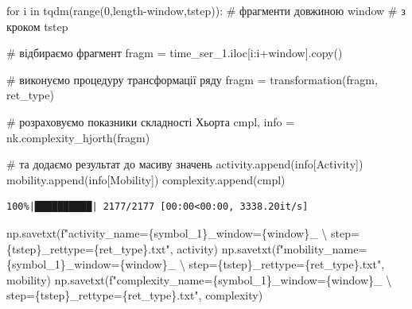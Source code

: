 \documentclass[
  letterpaper,
]{report}
\newenvironment{Shaded}{\begin{snugshade}}{\end{snugshade}}
\newcommand{\BuiltInTok}[1]{\textcolor[rgb]{0.00,0.23,0.31}{#1}}
\newcommand{\CharTok}[1]{\textcolor[rgb]{0.13,0.47,0.30}{#1}}
\newcommand{\CommentTok}[1]{\textcolor[rgb]{0.37,0.37,0.37}{#1}}
\newcommand{\ControlFlowTok}[1]{\textcolor[rgb]{0.00,0.23,0.31}{#1}}
\newcommand{\DecValTok}[1]{\textcolor[rgb]{0.68,0.00,0.00}{#1}}
\newcommand{\KeywordTok}[1]{\textcolor[rgb]{0.00,0.23,0.31}{#1}}
\newcommand{\NormalTok}[1]{\textcolor[rgb]{0.00,0.23,0.31}{#1}}
\newcommand{\OperatorTok}[1]{\textcolor[rgb]{0.37,0.37,0.37}{#1}}
\newcommand{\SpecialCharTok}[1]{\textcolor[rgb]{0.37,0.37,0.37}{#1}}
\newcommand{\SpecialStringTok}[1]{\textcolor[rgb]{0.13,0.47,0.30}{#1}}
\newcommand{\StringTok}[1]{\textcolor[rgb]{0.13,0.47,0.30}{#1}}
\begin{document}
\begin{Shaded}
\begin{Highlighting}[]
\ControlFlowTok{for}\NormalTok{ i }\KeywordTok{in}\NormalTok{ tqdm(}\BuiltInTok{range}\NormalTok{(}\DecValTok{0}\NormalTok{,length}\OperatorTok{{-}}\NormalTok{window,tstep)): }\CommentTok{\# фрагменти довжиною window  }
                                             \CommentTok{\# з кроком tstep}

    \CommentTok{\# відбираємо фрагмент}
\NormalTok{    fragm }\OperatorTok{=}\NormalTok{ time\_ser\_1.iloc[i:i}\OperatorTok{+}\NormalTok{window].copy()   }

    \CommentTok{\# виконуємо процедуру трансформації ряду }
\NormalTok{    fragm }\OperatorTok{=}\NormalTok{ transformation(fragm, ret\_type)}

    \CommentTok{\# розраховуємо показники складності Хьорта}
\NormalTok{    cmpl, info }\OperatorTok{=}\NormalTok{ nk.complexity\_hjorth(fragm) }

    \CommentTok{\# та додаємо результат до масиву значень}
\NormalTok{    activity.append(info[}\StringTok{\textquotesingle{}Activity\textquotesingle{}}\NormalTok{])}
\NormalTok{    mobility.append(info[}\StringTok{\textquotesingle{}Mobility\textquotesingle{}}\NormalTok{])}
\NormalTok{    complexity.append(cmpl)}
\end{Highlighting}
\end{Shaded}

\begin{verbatim}
100%|██████████| 2177/2177 [00:00<00:00, 3338.20it/s]
\end{verbatim}

\begin{Shaded}
\begin{Highlighting}[]
\NormalTok{np.savetxt(}\SpecialStringTok{f"activity\_name=}\SpecialCharTok{\{}\NormalTok{symbol\_1}\SpecialCharTok{\}}\SpecialStringTok{\_window=}\SpecialCharTok{\{}\NormalTok{window}\SpecialCharTok{\}}\SpecialStringTok{\_ }\CharTok{\textbackslash{}}
\SpecialStringTok{    step=}\SpecialCharTok{\{}\NormalTok{tstep}\SpecialCharTok{\}}\SpecialStringTok{\_rettype=}\SpecialCharTok{\{}\NormalTok{ret\_type}\SpecialCharTok{\}}\SpecialStringTok{.txt"}\NormalTok{, activity)}
\NormalTok{np.savetxt(}\SpecialStringTok{f"mobility\_name=}\SpecialCharTok{\{}\NormalTok{symbol\_1}\SpecialCharTok{\}}\SpecialStringTok{\_window=}\SpecialCharTok{\{}\NormalTok{window}\SpecialCharTok{\}}\SpecialStringTok{\_ }\CharTok{\textbackslash{}}
\SpecialStringTok{    step=}\SpecialCharTok{\{}\NormalTok{tstep}\SpecialCharTok{\}}\SpecialStringTok{\_rettype=}\SpecialCharTok{\{}\NormalTok{ret\_type}\SpecialCharTok{\}}\SpecialStringTok{.txt"}\NormalTok{, mobility)}
\NormalTok{np.savetxt(}\SpecialStringTok{f"complexity\_name=}\SpecialCharTok{\{}\NormalTok{symbol\_1}\SpecialCharTok{\}}\SpecialStringTok{\_window=}\SpecialCharTok{\{}\NormalTok{window}\SpecialCharTok{\}}\SpecialStringTok{\_ }\CharTok{\textbackslash{}}
\SpecialStringTok{    step=}\SpecialCharTok{\{}\NormalTok{tstep}\SpecialCharTok{\}}\SpecialStringTok{\_rettype=}\SpecialCharTok{\{}\NormalTok{ret\_type}\SpecialCharTok{\}}\SpecialStringTok{.txt"}\NormalTok{, complexity)    }
\end{Highlighting}
\end{Shaded}
\end{document}
